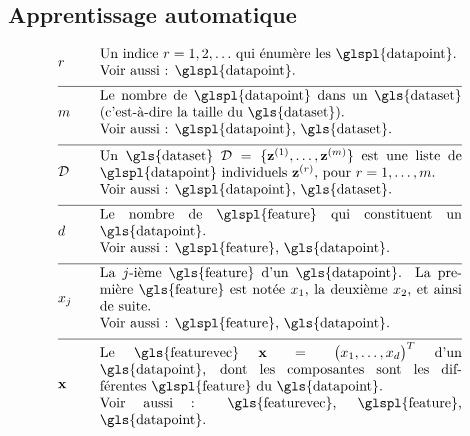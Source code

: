 \newpage
\subsection*{Apprentissage automatique}

\begin{align}
	& \sampleidx & \quad & \parbox{.75\textwidth}{Un indice $\sampleidx=1,2,\ldots$ qui énumère les \glspl{datapoint}. \\ Voir aussi : \glspl{datapoint}.} \nonumber \\[2mm] \hline \nonumber\\[-5mm]
	& \samplesize & \quad & \parbox{.75\textwidth}{Le nombre de \glspl{datapoint} dans un \gls{dataset} (c’est-à-dire la taille du \gls{dataset}). \\ Voir aussi : \glspl{datapoint}, \gls{dataset}.} \nonumber \\[2mm] \hline \nonumber\\[-5mm] 
	& \dataset & \quad & \parbox{.75\textwidth}{Un \gls{dataset} $\dataset = \{ \datapoint^{(1)},\ldots, \datapoint^{(\samplesize)} \}$ est une liste de \glspl{datapoint} individuels $\datapoint^{(\sampleidx)}$, pour $\sampleidx=1,\ldots,\samplesize$. \\ Voir aussi : \glspl{datapoint}, \gls{dataset}.} \nonumber \\[2mm] \hline \nonumber\\[-5mm]
	& \featurelen & \quad & \parbox{.75\textwidth}{Le nombre de \glspl{feature} qui constituent un \gls{datapoint}. \\ Voir aussi : \glspl{feature}, \gls{datapoint}.} \nonumber \\[2mm] \hline \nonumber\\[-5mm]
	& \feature_{\featureidx} & \quad & \parbox{.75\textwidth}{La $\featureidx$-ième \gls{feature} d’un \gls{datapoint}. La première \gls{feature} est notée $\feature_{1}$, la deuxième $\feature_{2}$, et ainsi de suite. \\ Voir aussi : \glspl{feature}, \gls{datapoint}.} \nonumber \\[2mm] \hline \nonumber\\[-5mm] 
	& \featurevec & \quad & \parbox{.75\textwidth}{Le \gls{featurevec} $\featurevec=\big(\feature_{1},\ldots,\feature_{\featuredim}\big)^{T}$ d’un \gls{datapoint}, dont les composantes sont les différentes \glspl{feature} du \gls{datapoint}. \\ Voir aussi : \gls{featurevec}, \glspl{feature}, \gls{datapoint}.} \nonumber
\end{align}



